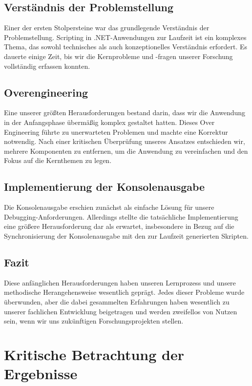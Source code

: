 \subsection*{Verständnis der Problemstellung}
Einer der ersten Stolpersteine war das grundlegende Verständnis der Problemstellung. 
Scripting in .NET-Anwendungen zur Laufzeit ist ein komplexes Thema, das sowohl technisches 
als auch konzeptionelles Verständnis erfordert. Es dauerte einige Zeit, bis wir die 
Kernprobleme und -fragen unserer Forschung vollständig erfassen konnten.

\subsection*{Overengineering}
Eine unserer größten Herausforderungen bestand darin, dass wir die Anwendung in der 
Anfangsphase übermäßig komplex gestaltet hatten. Dieses Over Engineering führte zu 
unerwarteten Problemen und machte eine Korrektur notwendig. Nach einer kritischen 
Überprüfung unseres Ansatzes entschieden wir, mehrere Komponenten zu entfernen, 
um die Anwendung zu vereinfachen und den Fokus auf die Kernthemen zu legen.

\subsection*{Implementierung der Konsolenausgabe}
Die Konsolenausgabe erschien zunächst als einfache Lösung für unsere Debugging-Anforderungen. 
Allerdings stellte die tatsächliche Implementierung eine größere Herausforderung dar als erwartet,
insbesondere in Bezug auf die Synchronisierung der Konsolenausgabe mit den zur Laufzeit 
generierten Skripten.

\newpage
\subsection*{Fazit}
Diese anfänglichen Herausforderungen haben unseren Lernprozess und unsere methodische 
Herangehensweise wesentlich geprägt. Jedes dieser Probleme wurde überwunden, aber die 
dabei gesammelten Erfahrungen haben wesentlich zu unserer fachlichen Entwicklung 
beigetragen und werden zweifellos von Nutzen sein, wenn wir uns zukünftigen 
Forschungsprojekten stellen.

\newpage
\section{Kritische Betrachtung der Ergebnisse}

